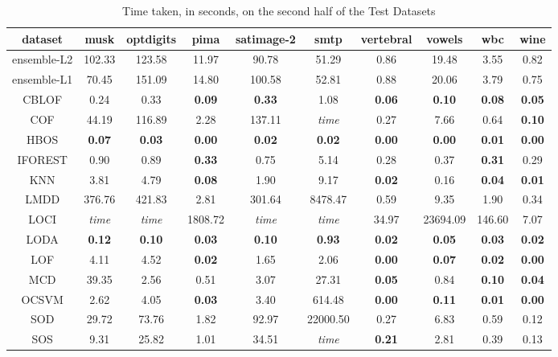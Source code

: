 \begin{table*}[!b]
\renewcommand{\arraystretch}{1.25}
\caption{Time taken, in seconds, on the second half of the Test Datasets}
\label{table:results:test-time-2}
\centering
\begin{tabular}{|c|c|c|c|c|c|c|c|c|c|}
    \hline
    \textbf{dataset} & \textbf{musk} & \textbf{optdigits} & \textbf{pima} & \textbf{satimage-2} & \textbf{smtp} & \textbf{vertebral} & \textbf{vowels} & \textbf{wbc} & \textbf{wine} \\
    \hline
    ensemble-L2 & 102.33 & 123.58 & 11.97 & 90.78 & 51.29 & 0.86 & 19.48 & 3.55 & 0.82 \\
    \hline
    ensemble-L1 & 70.45 & 151.09 & 14.80 & 100.58 & 52.81 & 0.88 & 20.06 & 3.79 & 0.75 \\
    \hline
    CBLOF & 0.24 & 0.33 & \bfseries 0.09 & \bfseries 0.33 & 1.08 & \bfseries 0.06 & \bfseries 0.10 & \bfseries 0.08 & \bfseries 0.05 \\
    \hline
    COF & 44.19 & 116.89 & 2.28 & 137.11 & \textit{time} & 0.27 & 7.66 & 0.64 & \bfseries 0.10 \\
    \hline
    HBOS & \bfseries 0.07 & \bfseries 0.03 & \bfseries 0.00 & \bfseries 0.02 & \bfseries 0.02 & \bfseries 0.00 & \bfseries 0.00 & \bfseries 0.01 & \bfseries 0.00 \\
    \hline
    IFOREST & 0.90 & 0.89 & \bfseries 0.33 & 0.75 & 5.14 & 0.28 & 0.37 & \bfseries 0.31 & 0.29 \\
    \hline
    KNN & 3.81 & 4.79 & \bfseries 0.08 & 1.90 & 9.17 & \bfseries 0.02 & 0.16 & \bfseries 0.04 & \bfseries 0.01 \\
    \hline
    LMDD & 376.76 & 421.83 & 2.81 & 301.64 & 8478.47 & 0.59 & 9.35 & 1.90 & 0.34 \\
    \hline
    LOCI & \textit{time} & \textit{time} & 1808.72 & \textit{time} & \textit{time} & 34.97 & 23694.09 & 146.60 & 7.07 \\
    \hline
    LODA & \bfseries 0.12 & \bfseries 0.10 & \bfseries 0.03 & \bfseries 0.10 & \bfseries 0.93 & \bfseries 0.02 & \bfseries 0.05 & \bfseries 0.03 & \bfseries 0.02 \\
    \hline
    LOF & 4.11 & 4.52 & \bfseries 0.02 & 1.65 & 2.06 & \bfseries 0.00 & \bfseries 0.07 & \bfseries 0.02 & \bfseries 0.00 \\
    \hline
    MCD & 39.35 & 2.56 & 0.51 & 3.07 & 27.31 & \bfseries 0.05 & 0.84 & \bfseries 0.10 & \bfseries 0.04 \\
    \hline
    OCSVM & 2.62 & 4.05 & \bfseries 0.03 & 3.40 & 614.48 & \bfseries 0.00 & \bfseries 0.11 & \bfseries 0.01 & \bfseries 0.00 \\
    \hline
    SOD & 29.72 & 73.76 & 1.82 & 92.97 & 22000.50 & 0.27 & 6.83 & 0.59 & 0.12 \\
    \hline
    SOS & 9.31 & 25.82 & 1.01 & 34.51 & \textit{time} & \bfseries 0.21 & 2.81 & 0.39 & 0.13 \\
    \hline
\end{tabular}
\end{table*}


